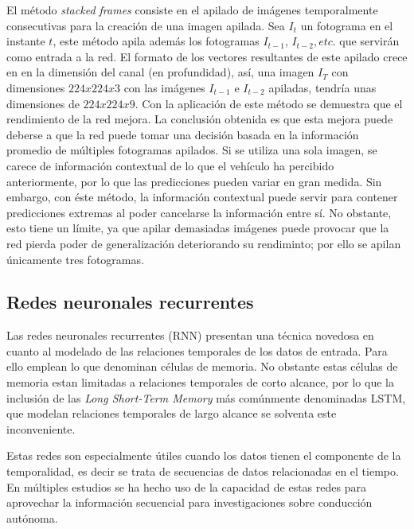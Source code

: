 El método \textit{stacked frames} consiste en el apilado de imágenes temporalmente consecutivas para la creación de una imagen apilada. Sea $I_t$ un fotograma en el instante $t$, este método apila además los fotogramas $I_{t-1}$, $I_{t-2}, etc.$ que servirán como entrada a la red. El formato de los vectores resultantes de este apilado crece en en la dimensión del canal (en profundidad), así, una imagen $I_T$ con dimensiones $224x224x3$ con las imágenes $I_{t-1}$ e $I_{t-2}$ apiladas, tendría unas dimensiones de $224x224x9$. Con la aplicación de este método se demuestra que el rendimiento de la red mejora. La conclusión obtenida es que esta mejora puede deberse a que la red puede tomar una decisión basada en la información promedio de múltiples fotogramas apilados. Si se utiliza una sola imagen, se carece de información contextual de lo que el vehículo ha percibido anteriormente, por lo que las predicciones pueden variar en gran medida. Sin embargo, con éste método, la información contextual puede servir para contener predicciones extremas al poder cancelarse la información entre sí. No obstante, esto tiene un límite, ya que apilar demasiadas imágenes puede provocar que la red pierda poder de generalización deteriorando su rendiminto; por ello se apilan únicamente tres fotogramas.

\subsection{Redes neuronales recurrentes}

Las redes neuronales recurrentes (RNN) presentan una técnica novedosa en cuanto al modelado de las relaciones temporales de los datos de entrada. Para ello emplean lo que denominan células de memoria. No obstante estas células de memoria estan limitadas a relaciones temporales de corto alcance, por lo que la inclusión de las \textit{Long Short-Term Memory} más comúnmente denominadas LSTM, que modelan relaciones temporales de largo alcance se solventa este inconveniente.

Estas redes son especialmente útiles cuando los datos tienen el componente de la temporalidad, es decir se trata de secuencias de datos relacionadas en el tiempo. En múltiples estudios se ha hecho uso de la capacidad de estas redes para aprovechar la información secuencial para investigaciones sobre conducción autónoma.

